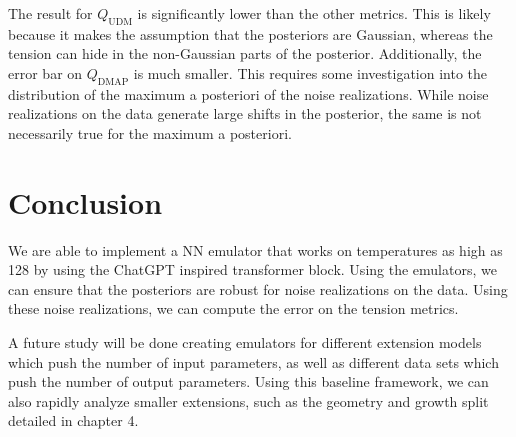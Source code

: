 The result for $Q_{\mathrm{UDM}}$ is significantly lower than the other metrics. This is likely because it makes the assumption that the posteriors are Gaussian, whereas the tension can hide in the non-Gaussian parts of the posterior. Additionally, the error bar on $Q_{\mathrm{DMAP}}$ is much smaller. This requires some investigation into the distribution of the maximum a posteriori of the noise realizations. While noise realizations on the data generate large shifts in the posterior, the same is not necessarily true for the maximum a posteriori.

\section{Conclusion}
We are able to implement a NN emulator that works on temperatures as high as 128 by using the ChatGPT inspired transformer block. Using the emulators, we can ensure that the posteriors are robust for noise realizations on the data. Using these noise realizations, we can compute the error on the tension metrics.

A future study will be done creating emulators for different extension models which push the number of input parameters, as well as different data sets which push the number of output parameters. Using this baseline framework, we can also rapidly analyze smaller extensions, such as the geometry and growth split detailed in chapter 4.









